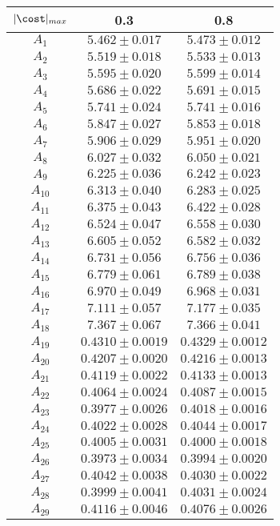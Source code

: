 \begin{tabular}{c|c|c}
$|\cost|_{max}$ & 0.3 & 0.8\\
\hline
$A_1$ & $5.462\pm0.017$ & $5.473\pm0.012$ \\
$A_2$ & $5.519\pm0.018$ & $5.533\pm0.013$ \\
$A_3$ & $5.595\pm0.020$ & $5.599\pm0.014$ \\
$A_4$ & $5.686\pm0.022$ & $5.691\pm0.015$ \\
$A_5$ & $5.741\pm0.024$ & $5.741\pm0.016$ \\
$A_6$ & $5.847\pm0.027$ & $5.853\pm0.018$ \\
$A_7$ & $5.906\pm0.029$ & $5.951\pm0.020$ \\
$A_8$ & $6.027\pm0.032$ & $6.050\pm0.021$ \\
$A_9$ & $6.225\pm0.036$ & $6.242\pm0.023$ \\
$A_10$ & $6.313\pm0.040$ & $6.283\pm0.025$ \\
$A_11$ & $6.375\pm0.043$ & $6.422\pm0.028$ \\
$A_12$ & $6.524\pm0.047$ & $6.558\pm0.030$ \\
$A_13$ & $6.605\pm0.052$ & $6.582\pm0.032$ \\
$A_14$ & $6.731\pm0.056$ & $6.756\pm0.036$ \\
$A_15$ & $6.779\pm0.061$ & $6.789\pm0.038$ \\
$A_16$ & $6.970\pm0.049$ & $6.968\pm0.031$ \\
$A_17$ & $7.111\pm0.057$ & $7.177\pm0.035$ \\
$A_18$ & $7.367\pm0.067$ & $7.366\pm0.041$ \\
$A_19$ & $0.4310\pm0.0019$ & $0.4329\pm0.0012$ \\
$A_20$ & $0.4207\pm0.0020$ & $0.4216\pm0.0013$ \\
$A_21$ & $0.4119\pm0.0022$ & $0.4133\pm0.0013$ \\
$A_22$ & $0.4064\pm0.0024$ & $0.4087\pm0.0015$ \\
$A_23$ & $0.3977\pm0.0026$ & $0.4018\pm0.0016$ \\
$A_24$ & $0.4022\pm0.0028$ & $0.4044\pm0.0017$ \\
$A_25$ & $0.4005\pm0.0031$ & $0.4000\pm0.0018$ \\
$A_26$ & $0.3973\pm0.0034$ & $0.3994\pm0.0020$ \\
$A_27$ & $0.4042\pm0.0038$ & $0.4030\pm0.0022$ \\
$A_28$ & $0.3999\pm0.0041$ & $0.4031\pm0.0024$ \\
$A_29$ & $0.4116\pm0.0046$ & $0.4076\pm0.0026$ \\

\end{tabular}
